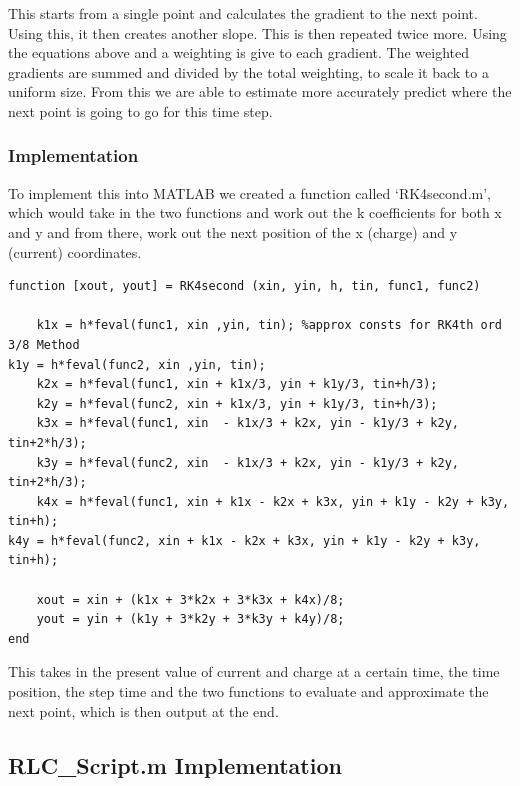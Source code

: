 \documentclass[11pt,a4paper]{article}
\begin{document}
This starts from a single point and calculates the gradient to the next point. Using this, it then creates another slope. This is then repeated twice more. Using the equations above and a weighting is give to each gradient. The weighted gradients are summed and divided by the total weighting, to scale it back to a uniform size. From this we are able to estimate more accurately predict where the next point is going to go for this time step.

\subsubsection{Implementation}

To implement this into MATLAB we created a function called `RK4second.m', which would take in the two functions and work out the k coefficients for both x and y and from there, work out the next position of the x (charge) and y (current) coordinates.

\begin{verbatim}
function [xout, yout] = RK4second (xin, yin, h, tin, func1, func2)

	k1x = h*feval(func1, xin ,yin, tin); %approx consts for RK4th ord 3/8 Method
k1y = h*feval(func2, xin ,yin, tin);
	k2x = h*feval(func1, xin + k1x/3, yin + k1y/3, tin+h/3);
	k2y = h*feval(func2, xin + k1x/3, yin + k1y/3, tin+h/3);
	k3x = h*feval(func1, xin  - k1x/3 + k2x, yin - k1y/3 + k2y, tin+2*h/3);
	k3y = h*feval(func2, xin  - k1x/3 + k2x, yin - k1y/3 + k2y, tin+2*h/3);
	k4x = h*feval(func1, xin + k1x - k2x + k3x, yin + k1y - k2y + k3y, tin+h);
k4y = h*feval(func2, xin + k1x - k2x + k3x, yin + k1y - k2y + k3y, tin+h);

	xout = xin + (k1x + 3*k2x + 3*k3x + k4x)/8;
	yout = yin + (k1y + 3*k2y + 3*k3y + k4y)/8;
end
\end{verbatim}

This takes in the present value of current and charge at a certain time, the time position, the step time and the two functions to evaluate and approximate the next point, which is then output at the end.

\subsection{RLC\_Script.m Implementation}
\end{document}
